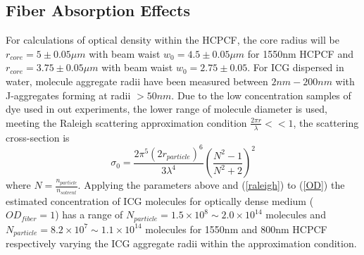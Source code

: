 \subsection{Fiber Absorption Effects}
For calculations of optical density within the HCPCF, the core radius will be  $r_{core} = 5\pm 0.05\mu m$ with beam waist $w_0 = 4.5 \pm 0.05\mu m$ for 1550nm HCPCF and $r_{core} = 3.75 \pm0.05\mu m$ with beam waist $w_0 = 2.75 \pm 0.05$. For ICG dispersed in water, molecule aggregate radii have been measured between $2nm - 200nm$ \cite{dedora} with J-aggregates forming at radii $>50nm$\cite{weigand}. Due to the low concentration samples of dye used in out experiments, the lower range of molecule diameter is used, meeting the Raleigh scattering approximation condition $\frac{2\pi r}{\lambda} <<1$, the scattering cross-section is 
\begin{equation}
	\sigma_0 = \frac{2\pi^5 (2r_{particle})^6}{3\lambda^4}(\frac{N^2 -1}{N^2+2})^2
	\label{raleigh}
\end{equation}
where $N=\frac{n_{particle}}{n_{solvent}}$. Applying the parameters above and  (\ref{raleigh}) to (\ref{OD}) the estimated concentration of ICG molecules for optically dense medium ($OD_{fiber}=1$) has a range of $N_{particle} = 1.5\times 10^8 \sim 2.0\times 10^{14}$ molecules and $N_{particle} = 8.2\times 10^7 \sim 1.1\times 10^{14}$ molecules for 1550nm and 800nm HCPCF respectively varying the ICG aggregate radii within the approximation condition. \\

